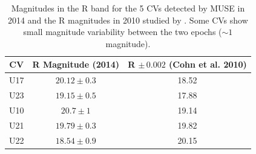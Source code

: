 
\begin{table}[]
\centering
\begin{tabular}{|c|c|c|}
\hline
\textbf{CV} & \textbf{R Magnitude (2014)} & \textbf{R $\mathbf{\pm \, 0.002}$ (Cohn et al. 2010)} \\ \hline
U17         & $20.12 \pm 0.3$                       & 18.52                          \\ \hline
U23         & $19.15 \pm 0.5$                      & 17.88                       \\ \hline
U10         & $20.7 \pm 1 $                        & 19.14                     \\ \hline
U21         & $19.79 \pm 0.3$                   & 19.82                    \\ \hline
U22         & $18.54 \pm 0.9 $                       & 20.15                              \\ \hline

\end{tabular}
   \caption{Magnitudes in the R band for the 5 CVs detected by MUSE in 2014 and the R magnitudes in 2010 studied by \cite{cohn_identification_2010}. Some CVs show small magnitude variability between the two epochs ($\sim 1$ magnitude).}
    \label{tab:truthTables}   
\end{table}

